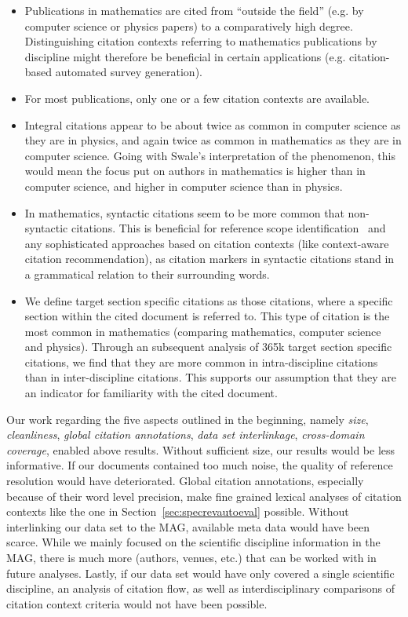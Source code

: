 \begin{itemize}
    \item Publications in mathematics are cited from ``outside the field'' (e.g. by computer science or physics papers) to a comparatively high degree. Distinguishing citation contexts referring to mathematics publications by discipline might therefore be beneficial in certain applications (e.g. citation-based automated survey generation).
    \item For most publications, only one or a few citation contexts are available.
    \item Integral citations appear to be about twice as common in computer science as they are in physics, and again twice as common in mathematics as they are in computer science. Going with Swale's interpretation of the phenomenon, this would mean the focus put on authors in mathematics is higher than in computer science, and higher in computer science than in physics.
    \item In mathematics, syntactic citations seem to be more common that non-syntactic citations. This is beneficial for reference scope identification~\cite{Abujbara2012} and any sophisticated approaches based on citation contexts (like context-aware citation recommendation), as citation markers in syntactic citations stand in a grammatical relation to their surrounding words.
    \item We define target section specific citations as those citations, where a specific section within the cited document is referred to. This type of citation is the most common in mathematics (comparing mathematics, computer science and physics). Through an subsequent analysis of 365k target section specific citations, we find that they are more common in intra-discipline citations than in inter-discipline citations. This supports our assumption that they are an indicator for familiarity with the cited document.
\end{itemize}

Our work regarding the five aspects outlined in the beginning, namely \emph{size}, \emph{cleanliness}, \emph{global citation annotations}, \emph{data set interlinkage}, \emph{cross-domain coverage}, enabled above results. Without sufficient size, our results would be less informative. If our documents contained too much noise, the quality of reference resolution would have deteriorated. Global citation annotations, especially because of their word level precision, make fine grained lexical analyses of citation contexts like the one in Section~\ref{sec:specrevautoeval} possible. Without interlinking our data set to the MAG, available meta data would have been scarce. While we mainly focused on the scientific discipline information in the MAG, there is much more (authors, venues, etc.) that can be worked with in future analyses. Lastly, if our data set would have only covered a single scientific discipline, an analysis of citation flow, as well as interdisciplinary comparisons of citation context criteria would not have been possible.

